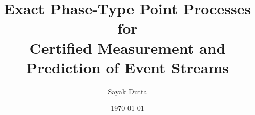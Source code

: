 \documentclass[11pt]{article}
\title{Exact Phase-Type Point Processes for\\
Certified Measurement and Prediction of Event Streams}
\author{Sayak Dutta}
\date{\today}
\theoremstyle{definition}
\theoremstyle{remark}
\begin{document}
\maketitle

\begin{abstract}

\end{abstract}














\appendix

\end{document}
